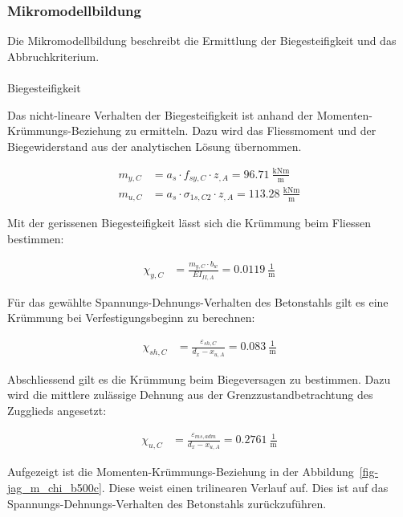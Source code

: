 \documentclass[
  11pt,
  letterpaper,
]{scrreprt}
\makeatletter
\let\oldparagraph\paragraph
\renewcommand{\paragraph}{
    \@ifstar
      \xxxParagraphStar
      \xxxParagraphNoStar
  }
\newcommand{\xxxParagraphStar}[1]{\oldparagraph*{#1}\mbox{}}
\newcommand{\xxxParagraphNoStar}[1]{\oldparagraph{#1}\mbox{}}
\makeatother
\begin{document}
\subsubsection{Mikromodellbildung}\label{mikromodellbildung-4}

Die Mikromodellbildung beschreibt die Ermittlung der Biegesteifigkeit
und das Abbruchkriterium.

\paragraph{Biegesteifigkeit}\label{biegesteifigkeit-4}

Das nicht-lineare Verhalten der Biegesteifigkeit ist anhand der
Momenten-Krümmungs-Beziehung zu ermitteln. Dazu wird das Fliessmoment
und der Biegewiderstand aus der analytischen Lösung übernommen.

\[
\begin{aligned}
m_{y , C}& = a_{s} \cdot f_{sy , C} \cdot z_{, A} = 96.71 \ \frac{\mathrm{kNm}}{\mathrm{m}} \\ 
m_{u , C}& = a_{s} \cdot \sigma_{1 s , C2} \cdot z_{, A} = 113.28 \ \frac{\mathrm{kNm}}{\mathrm{m}} \end{aligned}
\]

Mit der gerissenen Biegesteifigkeit lässt sich die Krümmung beim
Fliessen bestimmen:

\[
\begin{aligned}
\chi_{y , C}& = \frac{m_{y , C} \cdot b_{w}}{EI_{II , A}} = 0.0119 \ \frac{1}{\mathrm{m}} \end{aligned}
\]

Für das gewählte Spannungs-Dehnungs-Verhalten des Betonstahls gilt es
eine Krümmung bei Verfestigungsbeginn zu berechnen:

\[
\begin{aligned}
\chi_{sh , C}& = \frac{\varepsilon_{sh , C}}{d_{x} - x_{u , A}} = 0.083 \ \frac{1}{\mathrm{m}} \end{aligned}
\]

Abschliessend gilt es die Krümmung beim Biegeversagen zu bestimmen. Dazu
wird die mittlere zulässige Dehnung aus der Grenzzustandbetrachtung des
Zugglieds angesetzt:

\[
\begin{aligned}
\chi_{u , C}& = \frac{\varepsilon_{m s , adm}}{d_{x} - x_{u , A}} = 0.2761 \ \frac{1}{\mathrm{m}} \end{aligned}
\]

Aufgezeigt ist die Momenten-Krümmungs-Beziehung in der
Abbildung~\ref{fig-jag_m_chi_b500c}. Diese weist einen trilinearen
Verlauf auf. Dies ist auf das Spannungs-Dehnungs-Verhalten des
Betonstahls zurückzuführen.
\end{document}
